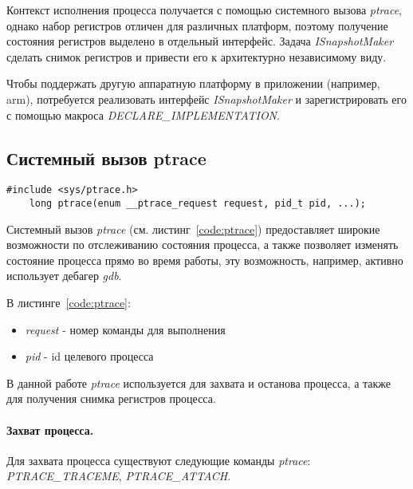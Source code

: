 Контекст исполнения процесса получается с помощью системного вызова \textit{ptrace}, однако набор регистров отличен для различных платформ, поэтому получение состояния регистров выделено в отдельный интерфейс. Задача \textit{ISnapshotMaker} сделать снимок регистров и привести его к архитектурно независимому виду.

Чтобы поддержать другую аппаратную платформу в приложении (например, arm), потребуется реализовать интерфейс \textit{ISnapshotMaker} и зарегистрировать его с помощью макроса \textit{DECLARE\_IMPLEMENTATION}.

\subsection{Системный вызов ptrace}

\begin{lstlisting}[caption=Вызов ptrace, label=code:ptrace]
    #include <sys/ptrace.h>
    long ptrace(enum __ptrace_request request, pid_t pid, ...);
\end{lstlisting}

Системный вызов \textit{ptrace} (см. листинг~\ref{code:ptrace}) предоставляет широкие возможности по отслеживанию состояния процесса, а также позволяет изменять состояние процесса прямо во время работы, эту возможность, например, активно использует дебагер \textit{gdb}.

В листинге~\ref{code:ptrace}:

\begin{itemize}

    \item \textit{request} - номер команды для выполнения
    \item \textit{pid} - id целевого процесса

\end{itemize}

В данной работе \textit{ptrace} используется для захвата и останова процесса, а также для получения снимка регистров процесса.

\paragraph{Захват процесса.}

Для захвата процесса существуют следующие команды \textit{ptrace}: \textit{PTRACE\_TRACEME}, \textit{PTRACE\_ATTACH}.

